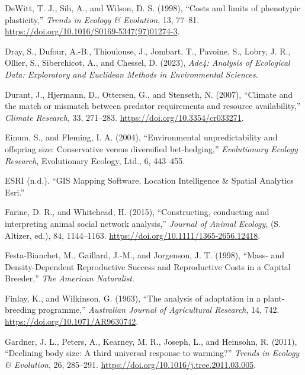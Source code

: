 \documentclass[
  12pt,
  letterpaper,
]{scrartcl}
\newlength{\cslhangindent}
\newenvironment{CSLReferences}[2] %
 {\begin{list}{}{%
  \setlength{\itemindent}{0pt}
  \setlength{\leftmargin}{0pt}
  \setlength{\parsep}{0pt}
  \ifodd #1
   \setlength{\leftmargin}{\cslhangindent}
   \setlength{\itemindent}{-1\cslhangindent}
  \fi
  \setlength{\itemsep}{#2\baselineskip}}}
 {\end{list}}
\begin{document}
\begin{CSLReferences}{1}{0}
DeWitt, T. J., Sih, A., and Wilson, D. S. (1998), {``Costs and limits of
phenotypic plasticity,''} \emph{Trends in Ecology \& Evolution}, 13,
77--81. \url{https://doi.org/10.1016/S0169-5347(97)01274-3}.

Dray, S., Dufour, A.-B., Thioulouse, J., Jombart, T., Pavoine, S.,
Lobry, J. R., Ollier, S., Siberchicot, A., and Chessel, D. (2023),
\emph{Ade4: {Analysis} of {Ecological Data}: {Exploratory} and
{Euclidean Methods} in {Environmental Sciences}}.

Durant, J., Hjermann, D., Ottersen, G., and Stenseth, N. (2007),
{``Climate and the match or mismatch between predator requirements and
resource availability,''} \emph{Climate Research}, 33, 271--283.
\url{https://doi.org/10.3354/cr033271}.

Einum, S., and Fleming, I. A. (2004), {``Environmental unpredictability
and offspring size: {Conservative} versus diversified bet-hedging,''}
\emph{Evolutionary Ecology Research}, Evolutionary Ecology, Ltd., 6,
443--455.

ESRI (n.d.). {``{GIS Mapping Software}, {Location Intelligence} \&
{Spatial Analytics} {\textbar} {Esri}.''}

Farine, D. R., and Whitehead, H. (2015), {``Constructing, conducting and
interpreting animal social network analysis,''} \emph{Journal of Animal
Ecology}, (S. Altizer, ed.), 84, 1144--1163.
\url{https://doi.org/10.1111/1365-2656.12418}.

Festa-Bianchet, M., Gaillard, J.-M., and Jorgenson, J. T. (1998),
{``Mass- and {Density-Dependent Reproductive Success} and {Reproductive
Costs} in a {Capital Breeder},''} \emph{The American Naturalist}.

Finlay, K., and Wilkinson, G. (1963), {``The analysis of adaptation in a
plant-breeding programme,''} \emph{Australian Journal of Agricultural
Research}, 14, 742. \url{https://doi.org/10.1071/AR9630742}.

Gardner, J. L., Peters, A., Kearney, M. R., Joseph, L., and Heinsohn, R.
(2011), {``Declining body size: A third universal response to
warming?''} \emph{Trends in Ecology \& Evolution}, 26, 285--291.
\url{https://doi.org/10.1016/j.tree.2011.03.005}.


\end{CSLReferences}
\end{document}
